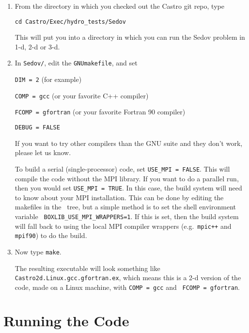 \begin{enumerate}

\item From the directory in which you checked out the Castro git repo,
  type
\begin{verbatim}
cd Castro/Exec/hydro_tests/Sedov
\end{verbatim}
This will put you into a directory in which you can run the Sedov
problem in 1-d, 2-d or 3-d.

\item In {\tt Sedov/}, edit the {\tt GNUmakefile}, and set

{\tt DIM = 2} (for example)

{\tt COMP = gcc} (or your favorite C++ compiler)

{\tt FCOMP = gfortran} (or your favorite Fortran 90 compiler)

{\tt DEBUG = FALSE}

If you want to try other compilers than the GNU suite and they don't
work, please let us know.

To build a serial (single-processor) code, set {\tt USE\_MPI = FALSE}.
This will compile the code without the MPI library.  If you want to do
a parallel run, then you would set {\tt USE\_MPI = TRUE}.  In this
case, the build system will need to know about your MPI installation.
This can be done by editing the makefiles in the \boxlib\ tree, but a
simple method is to set the shell environment variable {\tt
  BOXLIB\_USE\_MPI\_WRAPPERS=1}.  If this is set, then the build
system will fall back to using the local MPI compiler wrappers
(e.g.\ {\tt mpic++} and {\tt mpif90}) to do the build.

\item Now type {\tt make}.

  The resulting executable will look something like {\tt
    Castro2d.Linux.gcc.gfortran.ex}, which means this is a 2-d version
  of the code, made on a Linux machine, with {\tt COMP = gcc} and {\tt
    FCOMP = gfortran}.

\end{enumerate}

\section{Running the Code}


